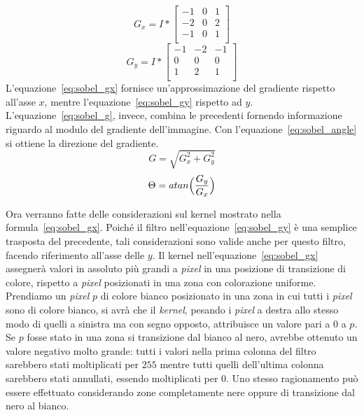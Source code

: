 \begin{equation} \label{eq:sobel_gx}
  G_x = 
  I
  *
  \begin{bmatrix}
    -1&0&1\\
    -2&0&2\\
    -1&0&1\\
  \end{bmatrix}
\end{equation}
\begin{equation} \label{eq:sobel_gy}
  G_y = 
  I
  *
  \begin{bmatrix}
    -1&-2&-1\\
    0&0&0\\
    1&2&1\\
  \end{bmatrix}
\end{equation}
L'equazione~\ref{eq:sobel_gx} fornisce un'approssimazione del gradiente rispetto all'asse $x$, mentre l'equazione~\ref{eq:sobel_gy} rispetto ad $y$.
L'equazione~\ref{eq:sobel_g}, invece, combina le precedenti fornendo informazione riguardo al modulo del gradiente dell'immagine.
Con l'equazione~\ref{eq:sobel_angle} si ottiene la direzione del gradiente.
\begin{equation} \label{eq:sobel_g}
  G = \sqrt{G_x^2 + G_y^2}
\end{equation}
\begin{equation} \label{eq:sobel_angle}
  \Theta = atan{\Bigl( \frac{G_y}{G_x} \Bigr)}
\end{equation}

Ora verranno fatte delle considerazioni sul kernel mostrato nella formula~\ref{eq:sobel_gx}.
Poiché il filtro nell'equazione~\ref{eq:sobel_gy} è una semplice trasposta del precedente, tali considerazioni sono valide anche per questo filtro, facendo riferimento all'asse delle $y$.
Il kernel nell'equazione~\ref{eq:sobel_gx} assegnerà valori in assoluto più grandi a \textit{pixel} in una posizione di transizione di colore, rispetto a \textit{pixel} posizionati in una zona con colorazione uniforme.
Prendiamo un \textit{pixel} $p$ di colore bianco posizionato in una zona in cui tutti i \textit{pixel} sono di colore bianco, si avrà che il \textit{kernel}, pesando i \textit{pixel} a destra allo stesso modo di quelli a sinistra ma con segno opposto, attribuisce un valore pari a $0$ a $p$.
Se $p$ fosse stato in una zona si transizione dal bianco al nero, avrebbe ottenuto un valore negativo molto grande:
tutti i valori nella prima colonna del filtro sarebbero stati moltiplicati per $255$ mentre tutti quelli dell'ultima colonna sarebbero stati annullati, essendo moltiplicati per $0$.
Uno stesso ragionamento può essere effettuato considerando zone completamente nere oppure di transizione dal nero al bianco.


